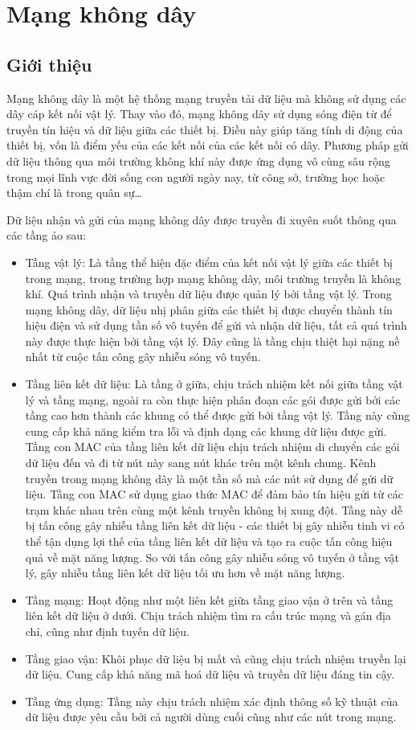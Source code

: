 \documentclass{uetgraduation}
\begin{document}
\section{Mạng không dây}
\subsection{Giới thiệu}
Mạng không dây là một hệ thống mạng truyền tải dữ liệu mà không sử dụng các dây cáp kết nối vật lý. Thay vào đó, mạng không dây sử dụng sóng
điện từ để truyền tín hiệu và dữ liệu giữa các thiết bị. Điều này giúp tăng tính di động của thiết bị, vốn là điểm yếu của các kết nối của các
kết nối có dây. Phương pháp gửi dữ liệu thông qua môi trường không khí này được ứng dụng vô cùng sâu rộng trong mọi lĩnh vực đời sống con người
ngày nay, từ công sở, trường học hoặc thậm chí là trong quân sự\dots

Dữ liệu nhận và gửi của mạng không dây được truyền đi xuyên suốt thông qua các tầng ảo sau:
\begin{itemize}
    \item Tầng vật lý: Là tầng thể hiện đặc điểm của kết nối vật lý giữa các thiết bị trong mạng, trong trường hợp mạng không dây, môi trường truyền
    là không khí. Quá trình nhận và truyền dữ liệu được quản lý bởi tầng vật lý. Trong mạng không dây, dữ liệu nhị phân giữa các thiết bị được chuyển
    thành tín hiệu điện và sử dụng tần số vô tuyến để gửi và nhận dữ liệu, tất cả quá trình này được thực hiện bởi tầng vật lý. Đây cũng là tầng chịu
    thiệt hại nặng nề nhất từ cuộc tấn công gây nhiễu sóng vô tuyến.
    \item Tầng liên kết dữ liệu: Là tầng ở giữa, chịu trách nhiệm kết nối giữa tầng vật lý và tầng mạng, ngoài ra còn thực hiện phân đoạn các gói được
    gửi bởi các tầng cao hơn thành các khung có thể được gửi bởi tầng vật lý. Tầng này cũng cung cấp khả năng kiểm tra lỗi và định dạng các khung dữ liệu
    được gửi. Tầng con MAC của tầng liên kết dữ liệu chịu trách nhiệm di chuyển các gói dữ liệu đến và đi từ nút này sang nút khác trên một kênh chung.
    Kênh truyền trong mạng không dây là một tần số mà các nút sử dụng để gửi dữ liệu. Tầng con MAC sử dụng giao thức MAC để đảm bảo tín hiệu gửi từ các
    trạm khác nhau trên cùng một kênh truyền không bị xung đột. Tầng này dễ bị tấn công gây nhiễu tầng liên kết dữ liệu - các thiết bị gây nhiễu tinh vi
    có thể tận dụng lợi thế của tầng liên kết dữ liệu và tạo ra cuộc tấn công hiệu quả về mặt năng lượng. So với tấn công gây nhiễu sóng vô tuyến ở tầng
    vật lý, gây nhiễu tầng liên kết dữ liệu tối ưu hơn về mặt năng lượng.
    \item Tầng mạng: Hoạt động như một liên kết giữa tầng giao vận ở trên và tầng liên kết dữ liệu ở dưới. Chịu trách nhiệm tìm ra cấu trúc mạng và gán địa
    chỉ, cũng như định tuyến dữ liệu.
    \item Tầng giao vận: Khôi phục dữ liệu bị mất và cũng chịu trách nhiệm truyền lại dữ liệu. Cung cấp khả năng mã hoá dữ liệu và truyền dữ liệu đáng tin cậy.
    \item Tầng ứng dụng: Tầng này chịu trách nhiệm xác định thông số kỹ thuật của dữ liệu được yêu cầu bởi cả người dùng cuối cũng như các nút trong mạng. 
\end{itemize}
\end{document}
